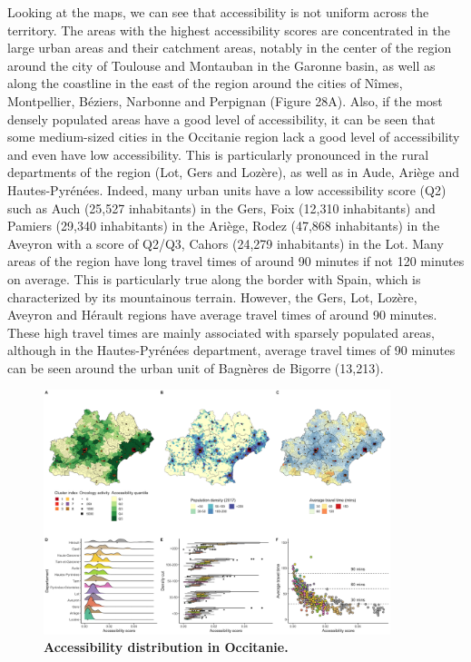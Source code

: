 Looking at the maps, we can see that accessibility is not uniform across the
territory. The areas with the highest accessibility scores are concentrated in
the large urban areas and their catchment areas, notably in the center of the
region around the city of Toulouse and Montauban in the Garonne basin, as well
as along the coastline in the east of the region around the cities of Nîmes,
Montpellier, Béziers, Narbonne and Perpignan (Figure 28A). Also, if the most
densely populated areas have a good level of accessibility, it can be seen that
some medium-sized cities in the Occitanie region lack a good level of
accessibility and even have low accessibility. This is particularly pronounced
in the rural departments of the region (Lot, Gers and Lozère), as well as in
Aude, Ariège and Hautes-Pyrénées. Indeed, many urban units have a low
accessibility score (Q2) such as Auch (25,527 inhabitants) in the Gers, Foix
(12,310 inhabitants) and Pamiers (29,340 inhabitants) in the Ariège, Rodez
(47,868 inhabitants) in the Aveyron with a score of Q2/Q3, Cahors (24,279
inhabitants) in the Lot. Many areas of the region have long travel times of
around 90 minutes if not 120 minutes on average. This is particularly true along
the border with Spain, which is characterized by its mountainous terrain.
However, the Gers, Lot, Lozère, Aveyron and Hérault regions have average travel
times of around 90 minutes. These high travel times are mainly associated with
sparsely populated areas, although in the Hautes-Pyrénées department, average
travel times of 90 minutes can be seen around the urban unit of Bagnères de
Bigorre (13,213).

\begin{figure}[H]
    \includegraphics[width=0.9\textwidth]{images/camion/region_accessibility/accessibility_Occitanie.png}
    \centering
    \caption{
        \textbf{Accessibility distribution in Occitanie.}
    }
\end{figure}


